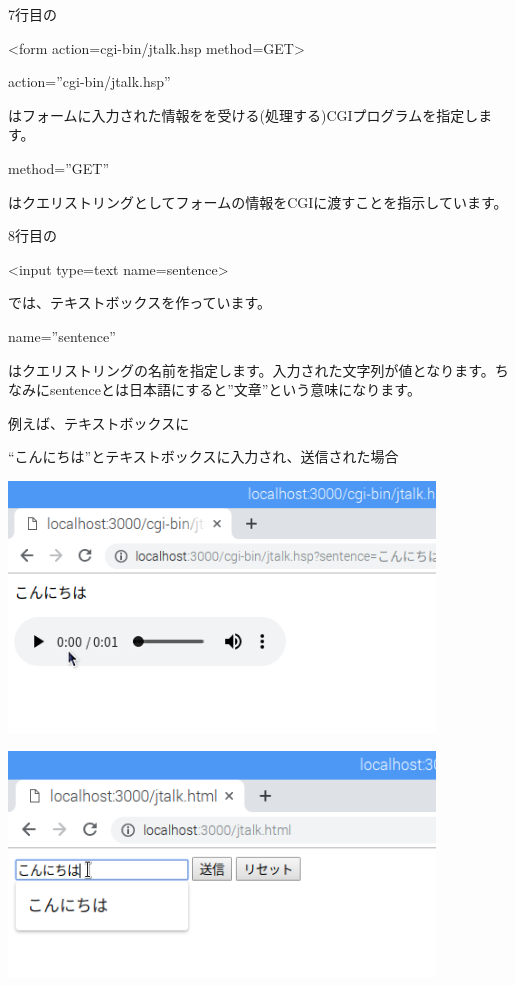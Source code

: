 %


7行目の

{\textless}form action={\textquotedbl}cgi-bin/jtalk.hsp{\textquotedbl}
method={\textquotedbl}GET{\textquotedbl}{\textgreater}

action=”cgi-bin/jtalk.hsp”

はフォームに入力された情報をを受ける(処理する)CGIプログラムを指定します。

method=”GET”

はクエリストリングとしてフォームの情報をCGIに渡すことを指示しています。

8行目の

{\textless}input type={\textquotedbl}text{\textquotedbl} name={\textquotedbl}sentence{\textquotedbl}{\textgreater}

では、テキストボックスを作っています。

name=”sentence”

はクエリストリングの名前を指定します。入力された文字列が値となります。ちなみにsentenceとは日本語にすると”文章”という意味になります。

例えば、テキストボックスに

“こんにちは”とテキストボックスに入力され、送信された場合

\clearpage
\bigskip



\centering
\includegraphics[width=0.85\textwidth]{text07-img/ome7-img057.png}

\centering
\includegraphics[width=0.85\textwidth]{text07-img/ome7-img056.png}
\flushleft


